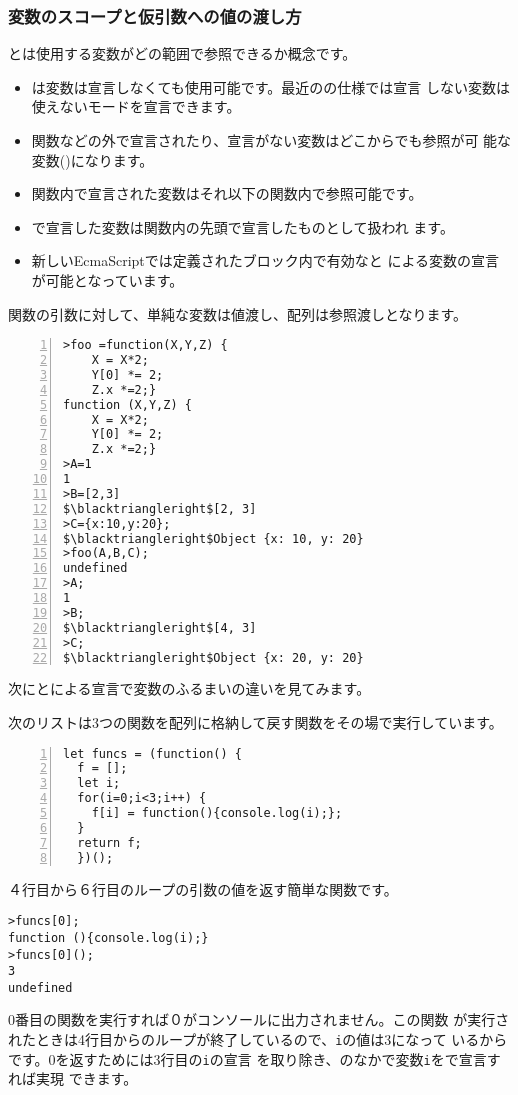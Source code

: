 \subsubsection{変数のスコープと仮引数への値の渡し方}
とは使用する変数がどの範囲で参照できるか概念です。
\begin{itemize}
 \item \JS は変数は宣言しなくても使用可能です。最近の\JS の仕様では宣言
			 しない変数は使えないモードを宣言できます。
 \item 関数などの外で宣言されたり、宣言がない変数はどこからでも参照が可
			 能な変数()になります。
 \item 関数内で宣言された変数はそれ以下の関数内で参照可能です。
 \item {}で宣言した変数は関数内の先頭で宣言したものとして扱われ
			 ます。
 \item 新しいEcmaScriptでは定義されたブロック内で有効なと
			 による変数の宣言が可能となっています。
\end{itemize}
関数の引数に対して、単純な変数は値渡し、配列は参照渡しとなります。
\begin{Verbatim}[numbers=left, fontsize=\small,
	commandchars=\\//,codes={\catcode`$=3\catcode`^=7}]
>foo =function(X,Y,Z) {
    X = X*2;
    Y[0] *= 2;
    Z.x *=2;}
function (X,Y,Z) {
    X = X*2;
    Y[0] *= 2;
    Z.x *=2;}
>A=1
1
>B=[2,3]
$\blacktriangleright$[2, 3]
>C={x:10,y:20};
$\blacktriangleright$Object {x: 10, y: 20}
>foo(A,B,C);
undefined
>A;
1
>B;
$\blacktriangleright$[4, 3]
>C;
$\blacktriangleright$Object {x: 20, y: 20}
\end{Verbatim}
次にとによる宣言で変数のふるまいの違いを見てみます。

次のリストは3つの関数を配列に格納して戻す関数をその場で実行しています。
\begin{Verbatim}[numbers=left]
let funcs = (function() {
  f = [];
  let i;
  for(i=0;i<3;i++) {
    f[i] = function(){console.log(i);};
  }
  return f;
  })();
\end{Verbatim}
４行目から６行目のループの引数の値を返す簡単な関数です。
\begin{Verbatim}
>funcs[0];
function (){console.log(i);}
>funcs[0]();
3
undefined
\end{Verbatim}
0番目の関数を実行すれば０がコンソールに出力されません。この関数
が実行されたときは4行目からのループが終了しているので、\texttt{i}の値は3になって
いるからです。0を返すためには3行目の\texttt{i}の宣言
を取り除き、のなかで変数\texttt{i}をで宣言すれば実現
できます。

